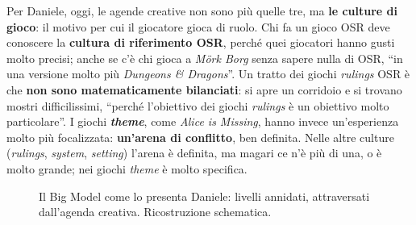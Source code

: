 Per Daniele, oggi, le agende creative non sono più quelle tre, ma \textbf{le culture di gioco}: il
motivo per cui il giocatore gioca di ruolo. Chi fa un gioco OSR deve conoscere la \textbf{cultura
di riferimento OSR}, perché quei giocatori hanno gusti molto precisi; anche se c'è chi gioca a
\emph{Mörk Borg} senza sapere nulla di OSR, ``in una versione molto più \emph{Dungeons \& Dragons}''.
Un tratto dei giochi \emph{rulings} OSR è che \textbf{non sono matematicamente bilanciati}: si apre
un corridoio e si trovano mostri difficilissimi, ``perché l'obiettivo dei giochi \emph{rulings} è un
obiettivo molto particolare''. I giochi \textbf{\emph{theme}}, come \emph{Alice is Missing}, hanno
invece un'esperienza molto più focalizzata: \textbf{un'arena di conflitto}, ben definita. Nelle
altre culture (\emph{rulings}, \emph{system}, \emph{setting}) l'arena è definita, ma magari ce n'è
più di una, o è molto grande; nei giochi \emph{theme} è molto specifica.

\begin{figure}[htbp]
\centering
{}
\caption{Il Big Model come lo presenta Daniele: livelli annidati, attraversati dall'agenda creativa.
Ricostruzione schematica.}
\label{a16:fig:bigmodel}
\end{figure}

